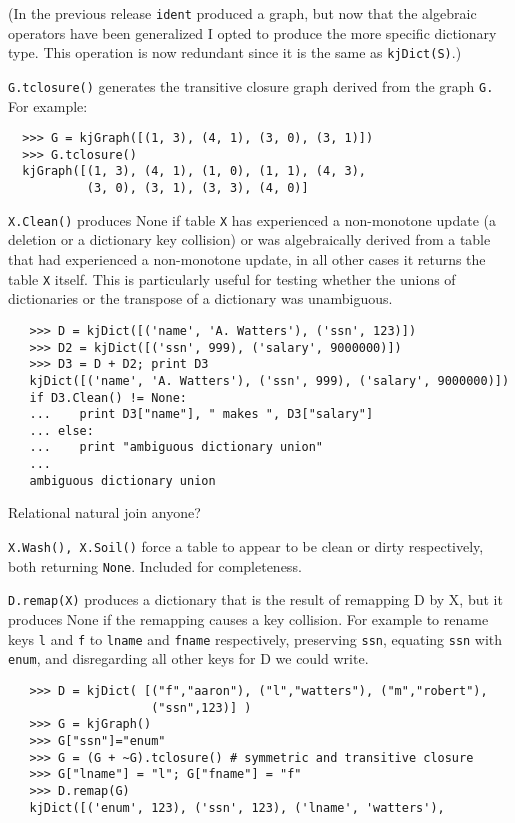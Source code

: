 \begin{description}
(In the previous release {\tt ident} produced a graph,
but now that the algebraic operators have been generalized I
opted to produce the more specific dictionary type.  This operation
is now redundant since it is the same as {\tt kjDict(S)}.)
%
\item{\tt G.tclosure()}
generates the transitive closure graph 
derived from the graph {\tt G.}  
For example:
\begin{verbatim}
  >>> G = kjGraph([(1, 3), (4, 1), (3, 0), (3, 1)])
  >>> G.tclosure()
  kjGraph([(1, 3), (4, 1), (1, 0), (1, 1), (4, 3), 
           (3, 0), (3, 1), (3, 3), (4, 0)]
\end{verbatim}
%
\item{\tt X.Clean()}
produces None if table {\tt X} has experienced a non-monotone
update (a deletion or a dictionary key collision) or was
algebraically derived from a table that had experienced a
non-monotone update, in all other cases it returns the table
{\tt X} itself.  This is particularly useful for testing whether
the unions of dictionaries or the transpose of a dictionary
was unambiguous.
\begin{verbatim}
   >>> D = kjDict([('name', 'A. Watters'), ('ssn', 123)])
   >>> D2 = kjDict([('ssn', 999), ('salary', 9000000)])
   >>> D3 = D + D2; print D3
   kjDict([('name', 'A. Watters'), ('ssn', 999), ('salary', 9000000)])
   if D3.Clean() != None:
   ...    print D3["name"], " makes ", D3["salary"]
   ... else:
   ...    print "ambiguous dictionary union"
   ...
   ambiguous dictionary union
\end{verbatim}
Relational natural join anyone?
%
\item{\tt X.Wash(), X.Soil()}
force a table to appear to be clean or dirty respectively, both
returning {\tt None}.  Included for completeness.
%
\item{\tt D.remap(X)}
produces a dictionary that is the result of remapping
D by X, but it produces None if the remapping causes
a key collision.  For example to rename keys {\tt l} and
{\tt f} to {\tt lname} and {\tt fname} respectively, preserving
{\tt ssn}, equating {\tt ssn} with {\tt enum}, and disregarding
all other keys for D we could write.
\begin{verbatim}
   >>> D = kjDict( [("f","aaron"), ("l","watters"), ("m","robert"), 
                    ("ssn",123)] )
   >>> G = kjGraph()
   >>> G["ssn"]="enum"
   >>> G = (G + ~G).tclosure() # symmetric and transitive closure
   >>> G["lname"] = "l"; G["fname"] = "f"
   >>> D.remap(G)
   kjDict([('enum', 123), ('ssn', 123), ('lname', 'watters'), 

\end{verbatim}
\end{description}
